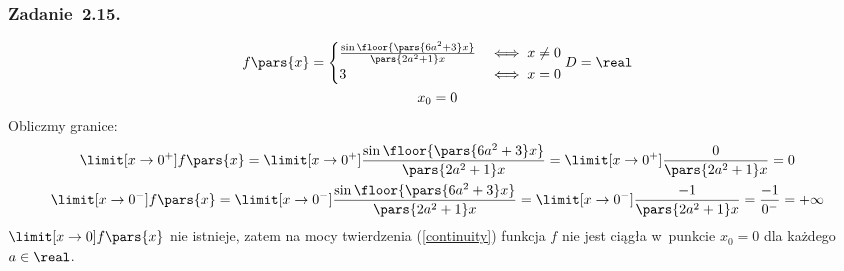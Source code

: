 \subsubsection*{Zadanie~2.15.}
\begin{gather*}
    f\pars{x} = \begin{cases}
        \frac{\sin\floor{\pars{6a^2 + 3}x}}{\pars{2a^2 + 1}x} & \iff x \neq 0\\
        3 & \iff x = 0
    \end{cases}
    D = \real\\
    x_0 = 0
\end{gather*}
Obliczmy granice:
\begin{gather*}
    \limit[x \to 0^+] f\pars{x}
        = \limit[x \to 0^+] \frac{\sin\floor{\pars{6a^2 + 3}x}}{\pars{2a^2 + 1}x}
        = \limit[x \to 0^+] \frac{0}{\pars{2a^2 + 1}x}
        = 0\\
    \limit[x \to 0^-] f\pars{x}
        = \limit[x \to 0^-] \frac{\sin\floor{\pars{6a^2 + 3}x}}{\pars{2a^2 + 1}x}
        = \limit[x \to 0^-] \frac{-1}{\pars{2a^2 + 1}x}
        = \frac{-1}{0^-}
        = +\infty\\
\end{gather*}
\(\limit[x \to 0] f\pars{x}\) nie istnieje, zatem na mocy twierdzenia (\ref{continuity}) funkcja \(f\) nie jest ciągła w~punkcie \(x_0 = 0\) dla każdego \(a \in \real\).
